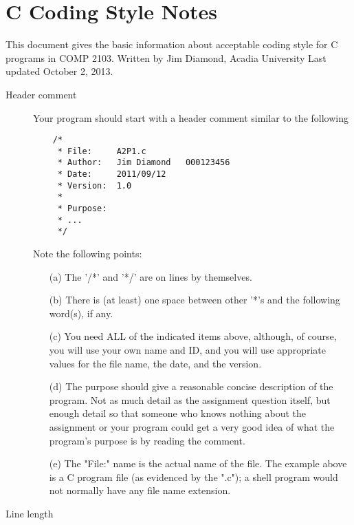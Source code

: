 \chapter{C Coding Style Notes}
\label{chap:C-coding-style-notes}
This document gives the basic information about acceptable coding
style for C programs in COMP 2103.
Written by Jim Diamond, Acadia University
Last updated October 2, 2013.
\begin{description}
\item[Header comment] \hfill

    Your program should start with a header comment similar to the following\:
\begin{verbatim}
    /*
     * File:     A2P1.c
     * Author:   Jim Diamond   000123456
     * Date:     2011/09/12
     * Version:  1.0
     *
     * Purpose:
     * ...
     */
\end{verbatim}
    Note the following points:
    \begin{enumerate}
    \item[(a)] The '/*' and '*/' are on lines by themselves.
    \item[(b)] There is (at least) one space between other '*'s and the
        following word(s), if any.
    \item[(c)] You need ALL of the indicated items above, although, of
        course, you will use your own name and ID, and you will use
        appropriate values for the file name, the date, and the version.
    \item[(d)] The purpose should give a reasonable concise description of
        the program.  Not as much detail as the assignment question
        itself, but enough detail so that someone who knows nothing
        about the assignment or your program could get a very good idea 
        of what the program's purpose is by reading the comment.
    \item[(e)]The "File:" name is the actual name of the file.  The example
        above is a C program file (as evidenced by the ".c");
        a shell program would not normally have any file name extension.
\end{enumerate}

\item[Line length] \hfill


\end{description}
